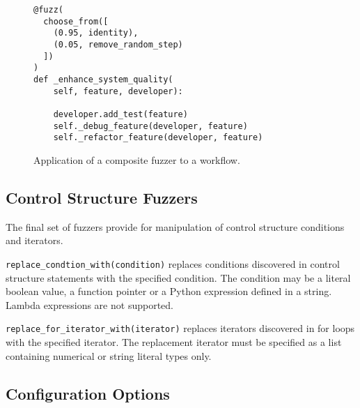 \documentclass{sig-alternate}
\newenvironment{FunctionList}{%
\lstset{basicstyle=\ttfamily\bfseries\small}
\begin{list}{}{\leftmargin=5pt}
}{\end{list}\lstset{basicstyle=\ttfamily\small}}
\begin{document}
\begin{figure}
  \centering

\begin{lstlisting}
@fuzz(
  choose_from([
    (0.95, identity),
    (0.05, remove_random_step)
  ])
)
def _enhance_system_quality(
    self, feature, developer):

    developer.add_test(feature)
    self._debug_feature(developer, feature)
    self._refactor_feature(developer, feature) 
\end{lstlisting}
  
  \caption{Application of a composite fuzzer to a workflow.}
  \label{fig:composite}
\end{figure}


\subsection{Control Structure Fuzzers}


The final set of fuzzers provide for manipulation of control structure
conditions and iterators.  

\begin{FunctionList}

\item \lstinline!replace_condtion_with(condition)! replaces conditions
  discovered in control structure statements with the specified condition.  The
  condition may be a literal boolean value, a function pointer or a Python
  expression defined in a string.  Lambda expressions are not supported.

\item \lstinline!replace_for_iterator_with(iterator)! replaces iterators
  discovered in for loops with the specified iterator.  The replacement iterator
  must be specified as a list containing numerical or string literal types only.

\end{FunctionList}


\subsection{Configuration Options}
\end{document}
